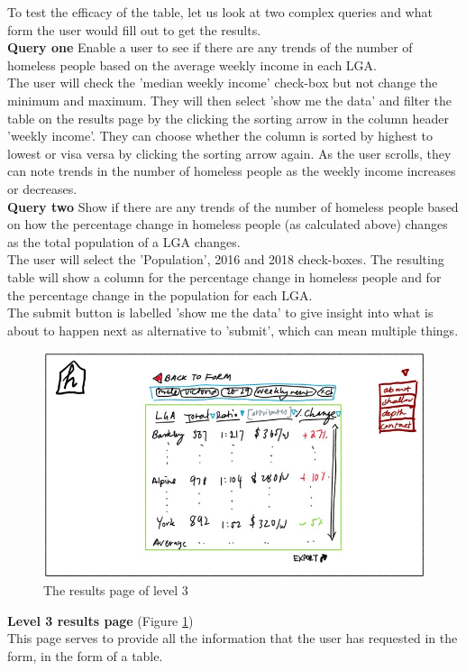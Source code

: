 \documentclass[12pt, a4paper]{article}
\begin{document}
To test the efficacy of the table, let us look at two complex queries and what form the user would fill out to get the results. \\
\textbf{Query one} Enable a user to see if there are any trends of the number of homeless people based on the average weekly income in each LGA. \\
The user will check the 'median weekly income' check-box but not change the minimum and maximum. They will then select 'show me the data' and filter the table on the results page by the clicking the sorting arrow in the column header 'weekly income'. They can choose whether the column is sorted by highest to lowest or visa versa by clicking the sorting arrow again. As the user scrolls, they can note trends in the number of homeless people as the weekly income increases or decreases. \\
\textbf{Query two} Show if there are any trends of the number of homeless people based on how the percentage change in homeless people (as calculated above) changes as the total population of a LGA changes. \\
The user will select the 'Population', 2016 and 2018 check-boxes. The resulting table will show a column for the percentage change in homeless people and for the percentage change in the population for each LGA.\\
The submit button is labelled 'show me the data' to give insight into what is about to happen next as alternative to 'submit', which can mean multiple things. 
\begin{figure}[h]
\centering
\includegraphics[scale=1]{level3results.jpg} 
\caption{The results page of level 3}
\label{fig:3results}
\end{figure}
\textbf{Level 3 results page} (Figure \ref{fig:3results}) \\
This page serves to provide all the information that the user has requested in the form, in the form of a table.
\end{document}
